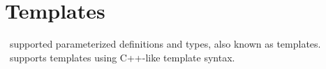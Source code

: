 
\section{Templates}
\label{sec:templates}

\CAST\ supported parameterized definitions and types, also known as templates.
\hac\ supports templates using C++-like template syntax.  

